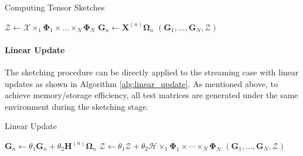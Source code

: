 \begin{algorithm}[ht]
\caption{Computing Tensor Sketches}\label{alg:tensor_sketch}
  \begin{algorithmic}[1]
  \State $\mathscr{Z} \leftarrow \mathscr{X}\times_1 \mathbf{\Phi}_1 \times \dots \times_N  \mathbf{\Phi}_N $
  \State $\mathbf{G}_n\leftarrow \mathbf{X}^{(n)}\mathbf{\Omega}_n $ 
  \EndFor 
  \State \Return $(\mathbf{G}_1,\dots,\mathbf{G}_N,\mathscr{Z})$
  \EndFunction
\end{algorithmic}
\end{algorithm}

\paragraph{Linear Update} 
The sketching procedure can be directly applied to the streaming case with linear updates as shown in Algorithm \ref{alg:linear_update}. As mentioned above, to achieve memory/storage efficiency, all test matrices are generated under the same environment during the sketching stage. 
\begin{algorithm}[ht]
\caption{Linear Update}\label{alg:linear_update}
  \begin{algorithmic}[1]
  \State $\mathbf{G}_n \leftarrow \theta_1 \mathbf{G}_n + \theta_2 \mathbf{H}^{(n)} \mathbf{\Omega}_n $ 
  \EndFor
  \State $\mathscr{Z} \leftarrow \theta_1 \mathscr{Z} + \theta_2 \mathscr{H} \times_1 \mathbf{\Phi}_1 \times \cdots \times_N \mathbf{\Phi}_N $
  \State \Return $(\mathbf{G}_1, \dots, \mathbf{G}_N, \mathscr{Z})$
  \EndFunction
\end{algorithmic}
\end{algorithm}


  
